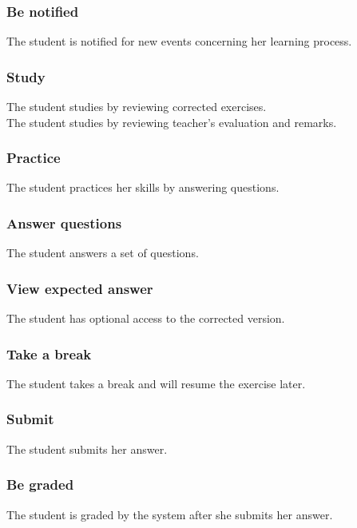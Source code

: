 		\subsubsection{Be notified}
			The student is notified for new events concerning her learning process.
		\subsubsection{Study}
			The student studies by reviewing corrected exercises.\\
			The student studies by reviewing teacher's evaluation and remarks.
		\subsubsection{Practice}
			The student practices her skills by answering questions.
		\subsubsection{Answer questions}
			The student answers a set of questions.
		\subsubsection{View expected answer}
			The student has optional access to the corrected version.
		\subsubsection{Take a break}
			The student takes a break and will resume the exercise later.
		\subsubsection{Submit}
			The student submits her answer.
		\subsubsection{Be graded}
			The student is graded by the system after she submits her answer.		
